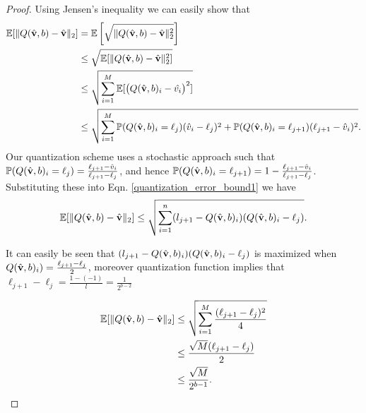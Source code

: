 \documentclass{article}
\begin{document}
\begin{proof}
Using Jensen's inequality we can easily show that
\begin{equation}\label{quantization_error_bound1}
\begin{split}
    \mathbb{E}[\| Q(\hat{\bf v}, b) - \hat{\bf v}\|_2] &= \mathbb{E}\left[\sqrt{\| Q(\hat{\bf v}, b) - \hat{\bf v}\|^2_2} \right]\\
    &\leq \sqrt{\mathbb{E}[\| Q(\hat{\bf v}, b) - \hat{\bf v}\|^2_2]}\\
    &\leq \sqrt{\sum_{i=1}^{M} \mathbb{E}[\big (Q(\hat{\bf v}, b)_i -\hat{v_i}\big)^2]}\\
    &\leq \sqrt{\sum_{i=1}^{M} \mathbb{P}(Q(\hat{\bf v}, b)_i = \ell_j)(\hat{v}_i-\ell_j)^2 + \mathbb{P}(Q(\hat{\bf v}, b)_i = \ell_{j+1})(\ell_{j+1}-\hat{v}_i)^2}.
\end{split}
\end{equation}
Our quantization scheme uses a stochastic approach such that $\mathbb{P}(Q(\hat{\bf v}, b)_i = \ell_j)=\frac{\ell_{j+1}-\hat{v}_i}{\ell_{j+1}-\ell_{j}}$, and hence $\mathbb{P}(Q(\hat{\bf v}, b)_i = \ell_{j+1})=1-\frac{\ell_{j+1}-\hat{v}_i}{\ell_{j+1}-\ell_{j}}$. Substituting these into Eqn. \ref{quantization_error_bound1} we have
\begin{equation}\label{quantization_error_sub}
\begin{split}
    \mathbb{E}[\| Q(\hat{\bf v}, b) - \hat{\bf v}\|_2] \leq \sqrt{\sum_{i=1}^{n} (l_{j+1}-Q(\hat{\bf v}, b)_i)(Q(\hat{\bf v}, b)_i-\ell_j)}.
\end{split}
\end{equation}

It can easily be seen that $(l_{j+1}-Q(\hat{\bf v}, b)_i)(Q(\hat{\bf v}, b)_i-\ell_j)$ is maximized when $Q(\hat{\bf v}, b)_i) =  \frac{\ell_{j+1}-\ell_j}{2}$, moreover quantization function implies that $\ell_{j+1}-\ell_j = \frac{1-(-1)}{l} = \frac{1}{2^{b-2}}$


\begin{equation}\label{quantization_error}
\begin{split}
    \mathbb{E}[\| Q(\hat{\bf v}, b) - \hat{\bf v}\|_2] &\leq \sqrt{\sum_{i=1}^{M} \frac{(\ell_{j+1}-\ell_j)^2}{4}}\\
    &\leq \frac{\sqrt{M}(\ell_{j+1}-\ell_j)}{2}\\
    &\leq \frac{\sqrt{M}}{2^{b-1}}.
\end{split}
\end{equation}
\end{proof}
\end{document}
